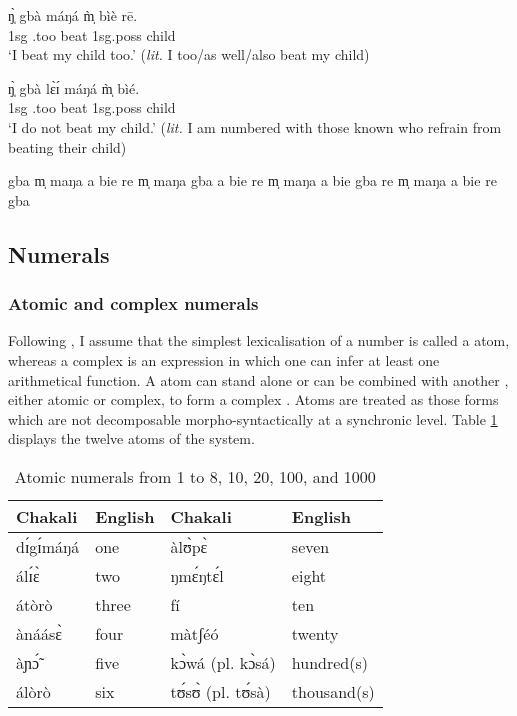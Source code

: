 \begin{exe}
\begin{exe}
\begin{exe}
\begin{exe}
\begin{exe}
\begin{exe}
\begin{exe}
\begin{exe}
\begin{exe}
\begin{exe}
\ea\label{ex:GRM-too}

 \ea\label{ex:GRM-too-pos}
\gll ŋ̩̀ gbà máŋá m̩̀ bìè rē.\\
{\sc 1sg} {\quant}.too  beat {\sc 1sg.poss}  child {\foc}\\
\glt  `I beat my child too.' ({\it lit.} I too/as well/also beat my
child)

 \ex\label{ex:GRM-too-neg}
\gll ŋ̩̀ gbà lɛ̀ɪ́ máŋá  m̩̀ bìé.\\
{\sc 1sg} {\quant}.too  {\neg} beat {\sc 1sg.poss}  child\\
\glt  `I do not beat my child.' ({\it lit.} I am numbered with those known who refrain from beating their child)


 \ex\label{ex:GRM-too-out-1}   \textasteriskcentered  gba m̩  maŋa a bie re
\ex \textasteriskcentered  m̩ maŋa gba a bie re
 \ex \textasteriskcentered  m̩ maŋa  a bie gba re
 \ex\label{ex:GRM-too-out-4} \textasteriskcentered  m̩ maŋa  a bie  re gba

\z 
 \z

 
 
 \subsection{Numerals}
\label{sec:GRM-numeral}


\subsubsection{Atomic and complex numerals}
\label{sec:NUM-bas-comp}

Following \citet[263]{Gree78b}, I assume that  the simplest lexicalisation of a number is called a  atom, whereas a complex  is an expression in which  one can infer at least one arithmetical function.  A  atom can stand alone or can be combined with another , either atomic or complex, to form a complex . Atoms are treated as  those forms which are not decomposable morpho-syntactically at a synchronic level. Table \ref{tab:numeralatoms} displays the twelve atoms of the  system.


\begin{table}
  \caption{Atomic numerals from 1 to 8, 10, 20, 100, and 1000
\label{tab:numeralatoms}}
   \centering
  \begin{tabular}{llll}
\lsptoprule
Chakali &  English &  Chakali &  English\\\midrule
 dɪ́gɪ́máŋá & one &   àlʊ̀pɛ̀   &seven\\
álɪ́ɛ̀ &two   &   ŋmɛ́ŋtɛ́l &eight\\
átòrò &three &   fí &ten\\
ànáásɛ̀ &four & màtʃéó  &twenty\\
 àɲɔ̃́ &five  &  kɔ̀wá (pl.  kɔ̀sá)   & hundred(s)\\
  álòrò   &six &   tʊ́sʊ̀  (pl.  tʊ́sà) &thousand(s)\\
 

\end{tabular}
\end{table}
\end{exe}
\end{exe}
\end{exe}
\end{exe}
\end{exe}
\end{exe}
\end{exe}
\end{exe}
\end{exe}
\end{exe}
